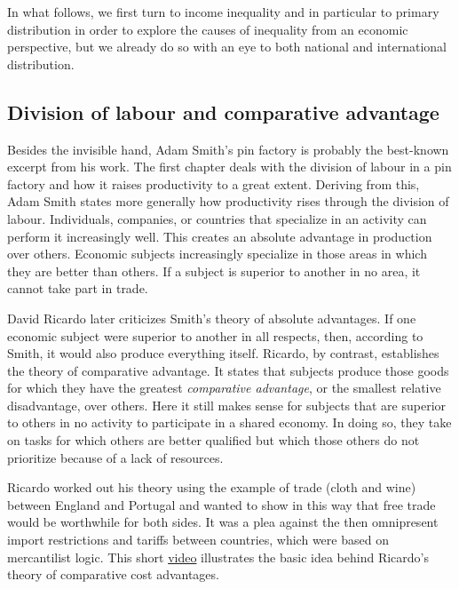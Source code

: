 \documentclass[
  british,
  a4paper,
  DIV=11,
  numbers=noendperiod,
  oneside,
  openany]{scrreprt}
\begin{document}
In what follows, we first turn to income inequality and in particular to
primary distribution in order to explore the causes of inequality from
an economic perspective, but we already do so with an eye to both
national and international distribution.

\subsection{Division of labour and comparative
advantage}\label{division-of-labour-and-comparative-advantage}

Besides the invisible hand, Adam Smith's pin factory is probably the
best-known excerpt from his work. The first chapter deals with the
division of labour in a pin factory and how it raises productivity to a
great extent. Deriving from this, Adam Smith states more generally how
productivity rises through the division of labour. Individuals,
companies, or countries that specialize in an activity can perform it
increasingly well. This creates an absolute advantage in production over
others. Economic subjects increasingly specialize in those areas in
which they are better than others. If a subject is superior to another
in no area, it cannot take part in trade.

David Ricardo later criticizes Smith's theory of absolute advantages. If
one economic subject were superior to another in all respects, then,
according to Smith, it would also produce everything itself. Ricardo, by
contrast, establishes the theory of comparative advantage. It states
that subjects produce those goods for which they have the greatest
\emph{comparative advantage}, or the smallest relative disadvantage,
over others. Here it still makes sense for subjects that are superior to
others in no activity to participate in a shared economy. In doing so,
they take on tasks for which others are better qualified but which those
others do not prioritize because of a lack of resources.

Ricardo worked out his theory using the example of trade (cloth and
wine) between England and Portugal and wanted to show in this way that
free trade would be worthwhile for both sides. It was a plea against the
then omnipresent import restrictions and tariffs between countries,
which were based on mercantilist logic. This short
\href{https://youtu.be/U12yZXBmQmY?si=_UOYx3y91fkzZXYK}{video}
illustrates the basic idea behind Ricardo's theory of comparative cost
advantages.
\end{document}
